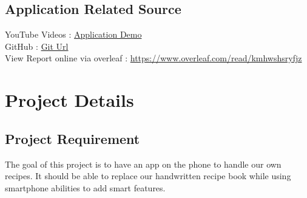 \documentclass{article}
\begin{document}
\subsection{Application Related Source}
YouTube Videos : \href{https://youtu.be/vgawyQmJWpk}{Application Demo} \\
GitHub : \href{https://github.com/thphuc/cooking-app }{Git Url} \\
View Report online via overleaf : \href{https://www.overleaf.com/read/kmhwshsryfjz
}{https://www.overleaf.com/read/kmhwshsryfjz}


\newpage
\section{Project Details }
\subsection{Project Requirement}
\qquad The goal of this project is to have an app on the phone to handle our own recipes. It should be able to replace our handwritten recipe book while using smartphone abilities to add smart features.
\end{document}
